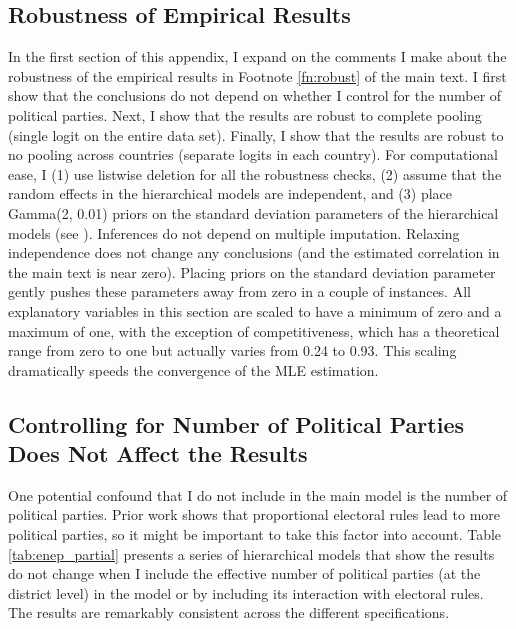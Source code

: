 \documentclass[12pt]{article}
\begin{document}
\begin{appendix}
\section{Robustness of Empirical Results}

In the first section of this appendix, I expand on the comments I make about the robustness of the empirical results in Footnote \ref{fn:robust} of the main text. I first show that the conclusions do not depend on whether I control for the number of political parties. Next, I show that the results are robust to complete pooling (single logit on the entire data set). Finally, I show that the results are robust to no pooling across countries (separate logits in each country). For computational ease, I (1) use listwise deletion for all the robustness checks, (2) assume that the random effects in the hierarchical models are independent, and (3) place Gamma(2, 0.01) priors on the standard deviation parameters of the hierarchical models (see \citealt{Chungetal2013}). Inferences do not depend on multiple imputation. Relaxing independence does not change any conclusions (and the estimated correlation in the main text is near zero). Placing priors on the standard deviation parameter gently pushes these parameters away from zero in a couple of instances. All explanatory variables in this section are scaled to have a minimum of zero and a maximum of one, with the exception of competitiveness, which has a theoretical range from zero to one but actually varies from 0.24 to 0.93. This scaling dramatically speeds the convergence of the MLE estimation.

\clearpage
\subsection{Controlling for Number of Political Parties Does Not Affect the Results}

One potential confound that I do not include in the main model is the number of political parties. Prior work shows that proportional electoral rules lead to more political parties, so it might be important to take this factor into account. Table \ref{tab:enep_partial} presents a series of hierarchical models that show the results do not change when I  include the effective number of political parties (at the district level) in the model or by including its interaction with electoral rules. The results are remarkably consistent across the different specifications.


\end{appendix}
\end{document}
